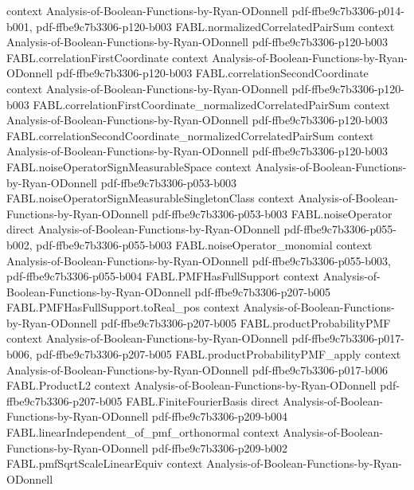 \begin{theorem}
  {context}
  {Analysis-of-Boolean-Functions-by-Ryan-ODonnell}
  {pdf-ffbe9c7b3306-p014-b001,
    pdf-ffbe9c7b3306-p120-b003}
\proofstep
  {FABL.normalizedCorrelatedPairSum}
  {context}
  {Analysis-of-Boolean-Functions-by-Ryan-ODonnell}
  {pdf-ffbe9c7b3306-p120-b003}
\proofstep
  {FABL.correlationFirstCoordinate}
  {context}
  {Analysis-of-Boolean-Functions-by-Ryan-ODonnell}
  {pdf-ffbe9c7b3306-p120-b003}
\proofstep
  {FABL.correlationSecondCoordinate}
  {context}
  {Analysis-of-Boolean-Functions-by-Ryan-ODonnell}
  {pdf-ffbe9c7b3306-p120-b003}
\proofstep
  {FABL.correlationFirstCoordinate_normalizedCorrelatedPairSum}
  {context}
  {Analysis-of-Boolean-Functions-by-Ryan-ODonnell}
  {pdf-ffbe9c7b3306-p120-b003}
\proofstep
  {FABL.correlationSecondCoordinate_normalizedCorrelatedPairSum}
  {context}
  {Analysis-of-Boolean-Functions-by-Ryan-ODonnell}
  {pdf-ffbe9c7b3306-p120-b003}
\proofstep
  {FABL.noiseOperatorSignMeasurableSpace}
  {context}
  {Analysis-of-Boolean-Functions-by-Ryan-ODonnell}
  {pdf-ffbe9c7b3306-p053-b003}
\proofstep
  {FABL.noiseOperatorSignMeasurableSingletonClass}
  {context}
  {Analysis-of-Boolean-Functions-by-Ryan-ODonnell}
  {pdf-ffbe9c7b3306-p053-b003}
\proofstep
  {FABL.noiseOperator}
  {direct}
  {Analysis-of-Boolean-Functions-by-Ryan-ODonnell}
  {pdf-ffbe9c7b3306-p055-b002,
    pdf-ffbe9c7b3306-p055-b003}
\proofstep
  {FABL.noiseOperator_monomial}
  {context}
  {Analysis-of-Boolean-Functions-by-Ryan-ODonnell}
  {pdf-ffbe9c7b3306-p055-b003,
    pdf-ffbe9c7b3306-p055-b004}
\proofstep
  {FABL.PMFHasFullSupport}
  {context}
  {Analysis-of-Boolean-Functions-by-Ryan-ODonnell}
  {pdf-ffbe9c7b3306-p207-b005}
\proofstep
  {FABL.PMFHasFullSupport.toReal_pos}
  {context}
  {Analysis-of-Boolean-Functions-by-Ryan-ODonnell}
  {pdf-ffbe9c7b3306-p207-b005}
\proofstep
  {FABL.productProbabilityPMF}
  {context}
  {Analysis-of-Boolean-Functions-by-Ryan-ODonnell}
  {pdf-ffbe9c7b3306-p017-b006,
    pdf-ffbe9c7b3306-p207-b005}
\proofstep
  {FABL.productProbabilityPMF_apply}
  {context}
  {Analysis-of-Boolean-Functions-by-Ryan-ODonnell}
  {pdf-ffbe9c7b3306-p017-b006}
\proofstep
  {FABL.ProductL2}
  {context}
  {Analysis-of-Boolean-Functions-by-Ryan-ODonnell}
  {pdf-ffbe9c7b3306-p207-b005}
\proofstep
  {FABL.FiniteFourierBasis}
  {direct}
  {Analysis-of-Boolean-Functions-by-Ryan-ODonnell}
  {pdf-ffbe9c7b3306-p209-b004}
\proofstep
  {FABL.linearIndependent_of_pmf_orthonormal}
  {context}
  {Analysis-of-Boolean-Functions-by-Ryan-ODonnell}
  {pdf-ffbe9c7b3306-p209-b002}
\proofstep
  {FABL.pmfSqrtScaleLinearEquiv}
  {context}
  {Analysis-of-Boolean-Functions-by-Ryan-ODonnell}

\end{theorem}
